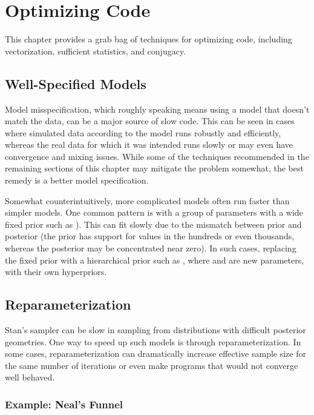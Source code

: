 \chapter{Optimizing \Stan Code}\label{optimization.chapter}
\noindent
This chapter provides a grab bag of techniques for optimizing \Stan
code, including vectorization, sufficient statistics, and conjugacy.

\section{Well-Specified Models}

Model misspecification, which roughly speaking means using a model
that doesn't match the data, can be a major source of slow code.  This
can be seen in cases where simulated data according to the model runs
robustly and efficiently, whereas the real data for which it was
intended runs slowly or may even have convergence and mixing issues.
While some of the techniques recommended in the remaining sections of
this chapter may mitigate the problem somewhat, the best remedy is a
better model specification.  

Somewhat counterintuitively, more complicated models often run faster
than simpler models.  One common pattern is with a group of parameters
with a wide fixed prior such as ).  This can fit
slowly due to the mismatch between prior and posterior (the prior has
support for values in the hundreds or even thousands, whereas the
posterior may be concentrated near zero).  In such cases, replacing
the fixed prior with a hierarchical prior such as , where  and  are new parameters, with
their own hyperpriors.


\section{Reparameterization}\label{reparameterization.section}

Stan's sampler can be slow in sampling from distributions with
difficult posterior geometries.  One way to speed up such models is
through reparameterization.  In some cases, reparameterization can
dramatically increase effective sample size for the same number of
iterations or even make programs that would not converge well
behaved. 

\subsection{Example: Neal's Funnel}

